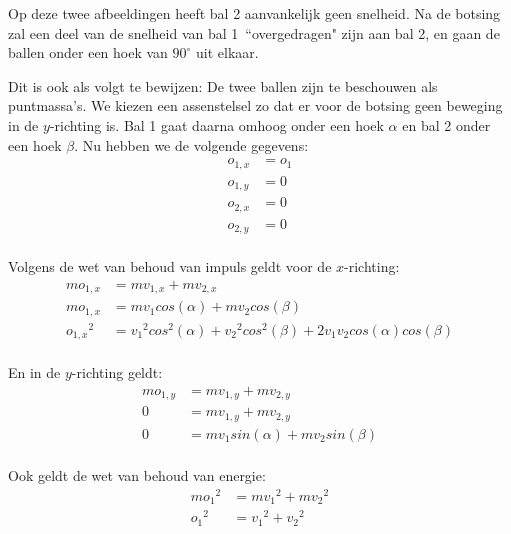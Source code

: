 \documentclass[12pt,a4paper]{article}
\begin{document}
	Op deze twee afbeeldingen heeft bal 2 aanvankelijk geen snelheid. Na de botsing zal een deel van de snelheid van bal 1\ ``overgedragen" zijn aan bal 2, en gaan de ballen onder een hoek van $90^{\circ}$ uit elkaar.

	Dit is ook als volgt te bewijzen:
	De twee ballen zijn te beschouwen als puntmassa's. We kiezen een assenstelsel zo dat er voor de botsing geen beweging in de $y$-richting is. Bal 1 gaat daarna omhoog onder een hoek $\alpha$ en bal 2 onder een hoek $\beta$. Nu hebben we de volgende gegevens:
	\begin{equation}
	\begin{aligned}
		o_{1, x}&=o_1\\
		o_{1, y}&=0\\
		o_{2, x}&=0\\
		o_{2, y}&=0\\
	\end{aligned}
	\end{equation}

	Volgens de wet van behoud van impuls geldt voor de $x$-richting:
	\begin{equation}
	\begin{aligned}
	\label{voorbeeld 1.1}
		mo_{1, x}&=mv_{1, x}+mv_{2, x}\\
		mo_{1, x}&=mv_1cos(\alpha)+mv_2cos(\beta)\\
		{o_{1, x}}^2&={v_1}^2cos^2(\alpha)+{v_2}^2cos^2(\beta)+2v_1v_2cos(\alpha)cos(\beta)\\
	\end{aligned}
	\end{equation}

	En in de $y$-richting geldt:
	\begin{equation}
	\begin{aligned}
	\label{voorbeeld 1.2}
		mo_{1, y}&=mv_{1, y}+mv_{2, y}\\
		0&=mv_{1, y}+mv_{2, y}\\
		0&=mv_1sin(\alpha)+mv_2sin(\beta)\\
	\end{aligned}
	\end{equation}

	Ook geldt de wet van behoud van energie:
	\begin{equation}
	\begin{aligned}
	\label{voorbeeld 1.3}
		m{o_1}^2&=m{v_1}^2+m{v_2}^2\\
		{o_1}^2&={v_1}^2+{v_2}^2\\
	\end{aligned}
	\end{equation}
\end{document}
